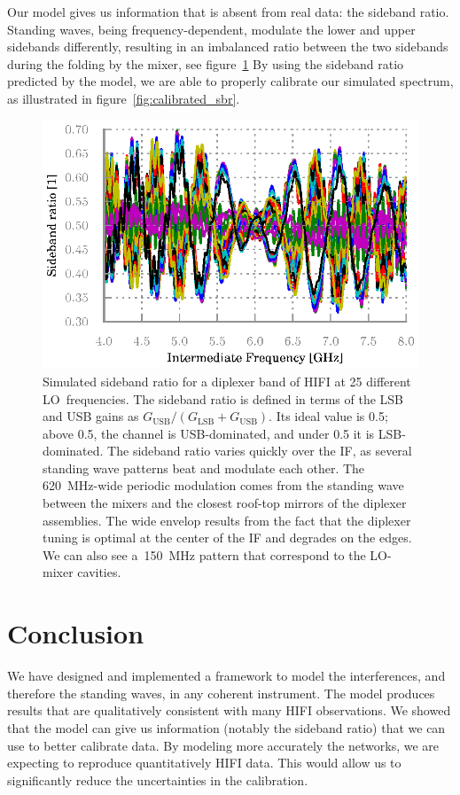 \documentclass[a4paper,11pt]{article}
\begin{document}
Our model gives us information that is absent from real data: the sideband ratio.
Standing waves, being frequency-dependent, modulate the lower and upper sidebands differently, resulting in an imbalanced ratio between the two sidebands during the folding by the mixer, see figure~\ref{fig:sbr}
By using the sideband ratio predicted by the model, we are able to properly calibrate our simulated spectrum, as illustrated in figure~\ref{fig:calibrated_sbr}.
\begin{figure}[hbtp]
    \centering
    \includegraphics{sbr}
    \caption{\label{fig:sbr}Simulated sideband ratio for a diplexer band of HIFI at 25 different LO~frequencies.
    The sideband ratio is defined in terms of the LSB and USB gains as $G_\text{USB}/(G_\text{LSB} + G_\text{USB})$.  Its ideal value is 0.5; above 0.5, the channel is USB-dominated, and under 0.5 it is LSB-dominated.
    The sideband ratio varies quickly over the IF, as several standing wave patterns beat and modulate each other.
    The \SI{620}{\mega\hertz}-wide periodic modulation comes from the standing wave between the mixers and the closest roof-top mirrors of the diplexer assemblies.  The wide envelop results from the fact that the diplexer tuning is optimal at the center of the IF and degrades on the edges.  We can also see a~\SI{150}{\mega\hertz} pattern that correspond to the LO-mixer cavities.}
\end{figure}






\section{Conclusion}
We have designed and implemented a framework to model the interferences, and therefore the standing waves, in any coherent instrument.
The model produces results that are qualitatively consistent with many HIFI observations.
We showed that the model can give us information (notably the sideband ratio) that we can use to better calibrate data.
By modeling more accurately the networks, we are expecting to reproduce quantitatively HIFI data.
This would allow us to significantly reduce the uncertainties in the calibration.


\printbibliography
\end{document}
